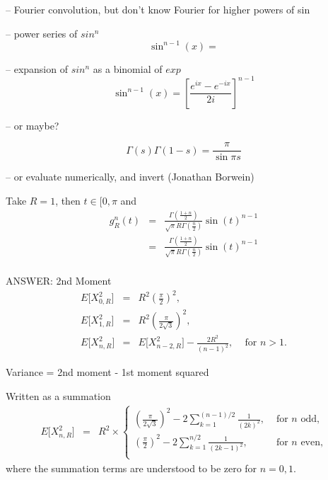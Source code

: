 -- Fourier convolution, but don't know Fourier for higher powers of sin

-- power series of $sin^n$
\begin{equation}
  \label{eq:sin^n_taylor}
  \sin^{n-1}(x) = 
\end{equation}

-- expansion of $sin^n$ as a binomial of $exp$
\begin{equation}
  \label{eq:sin^n_taylor}
  \sin^{n-1}(x) = \left[ \frac{e^{i x} - e^{-i x} }{2 i} \right]^{n-1}
\end{equation}

-- or maybe?

\[ \Gamma(s) \Gamma(1-s) = \frac{\pi}{\sin \pi s} \]


-- or evaluate numerically, and invert (Jonathan Borwein)


Take $R=1$, then $t \in [0, \pi$ and 
\begin{eqnarray}
g_{R}^{n}(t) & = &   \frac{\Gamma\left(\frac{1+n}{2}\right) }
                         {\sqrt{\pi } R\Gamma\left(\frac{n}{2}\right)}  
                      \sin(t)^{n-1} \nonumber \\
   & = &   \frac{\Gamma\left(\frac{1+n}{2}\right) }
                {\sqrt{\pi } R\Gamma\left(\frac{n}{2}\right)}  
                      \sin(t)^{n-1} \nonumber \\
\end{eqnarray}






ANSWER: 2nd Moment
\begin{eqnarray}
  \label{eq:mean_nsphere_geo}
  E\big[ X_{0,R}^2 \big] & = & R^2 \left( \frac{\pi}{2} \right)^2, \\ 
  E\big[ X_{1,R}^2 \big] & = & R^2 \left( \frac{\pi}{2 \sqrt{3}} \right)^2, \\ 
  E\big[ X_{n,R}^2 \big] & = & E\big[ X_{n-2,R}^2 \big] 
                                   - \frac{2 R^2}{(n-1)^2}, \;\;\;
                                   \mbox{ for } n > 1.
\end{eqnarray}

Variance = 2nd moment - 1st moment squared


Written as a summation
\begin{eqnarray}
  \label{eq:mean_nsphere_geo}
  E\big[ X_{n,R}^2 \big] & = & R^2 \times \left\{ \begin{array}{ll}
      \displaystyle
         \left( \frac{\pi}{2 \sqrt{3}} \right)^2
        - 2 \sum_{k=1}^{(n-1)/2} \frac{1}{(2k)^2}, & 
          \mbox{ for $n$ odd,} \\ 
      \displaystyle
         \left( \frac{\pi}{2} \right)^2 
        - 2 \sum_{k=1}^{n/2} \frac{1}{(2k-1)^2}, &
          \mbox{ for $n$ even,} \\ 
    \end{array} \right.
\end{eqnarray}
where the summation terms are understood to be zero for $n=0, 1$.



